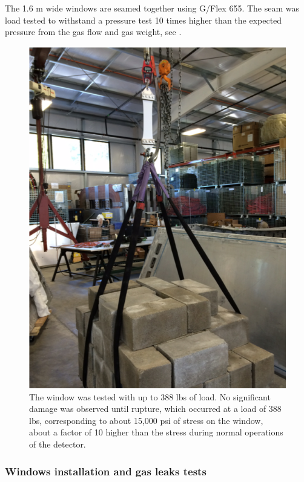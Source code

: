 The 1.6 m wide windows are seamed together using G/Flex 655. The seam was load tested to withstand a pressure test 10 times
higher than the expected pressure from the gas flow and gas weight, see .


\begin{figure}
	\centering
	\includegraphics[width=1.0\columnwidth,keepaspectratio]{img/windowTest.png}
	\caption{The window was tested with up to 388 lbs of load. No significant damage was observed until rupture, which occurred at a load of 388 lbs,
			   corresponding to about 15,000 psi of stress on the window, about a factor of 10 higher than the stress during normal operations of the detector.}
	\label{fig:windowTest}
\end{figure}

\subsubsection{Windows installation and gas leaks tests}

